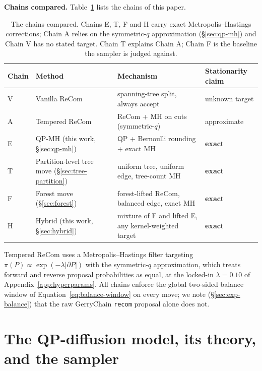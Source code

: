 \documentclass[11pt]{article}
\begin{document}
\textbf{Chains compared.} Table~\ref{tab:chains} lists the chains of
this paper.

\begin{table}[htbp]
\centering
\footnotesize
\begin{tabular}{llll}
\toprule
Chain & Method & Mechanism & Stationarity claim \\
\midrule
V & Vanilla ReCom~\cite{deford2021recombination} & spanning-tree split, always accept & unknown target \\
A & Tempered ReCom & ReCom + MH on cuts (symmetric-$q$) & approximate \\
E & QP-MH (this work, \S\ref{sec:qp-mh}) & QP + Bernoulli rounding + exact MH & \textbf{exact} \\
T & Partition-level tree move (\S\ref{sec:tree-partition}) & uniform tree, uniform edge, tree-count MH & \textbf{exact} \\
F & Forest move (\S\ref{sec:forest}) & forest-lifted ReCom, balanced edge, exact MH & \textbf{exact} \\
H & Hybrid (this work, \S\ref{sec:hybrid}) & mixture of F and lifted E, any kernel-weighted target & \textbf{exact} \\
\bottomrule
\end{tabular}
\caption{The chains compared. Chains E, T, F and H carry exact
  Metropolis--Hastings corrections; Chain A relies on the
  symmetric-$q$ approximation (\S\ref{sec:qp-mh}) and Chain V has no
  stated target. Chain T explains Chain A; Chain F is the baseline the
  sampler is judged against.}
\label{tab:chains}
\end{table}

Tempered ReCom uses a Metropolis--Hastings filter targeting
$\pi(P) \propto \exp(-\lambda |\partial P|)$ with the symmetric-$q$
approximation, which treats forward and reverse proposal
probabilities as equal, at the locked-in $\lambda = 0.10$ of
Appendix~\ref{app:hyperparams}. All chains enforce the global
two-sided balance window of Equation~\eqref{eq:balance-window} on
every move; we note (\S\ref{sec:exp-balance}) that the raw GerryChain
\texttt{recom} proposal alone does not.

\section{The QP-diffusion model, its theory, and the sampler}\label{sec:model}
\end{document}
